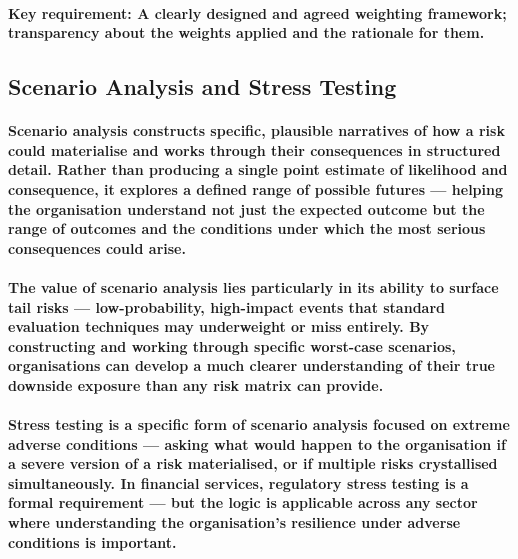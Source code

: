 \paragraph{\textbf{Key requirement}: A clearly designed and agreed weighting framework; transparency about the weights applied and the rationale for them.}

\subsection{Scenario Analysis and Stress Testing}
\paragraph{\textbf{Scenario analysis} constructs specific, plausible narratives of how a risk could materialise and works through their consequences in structured detail. Rather than producing a single point estimate of likelihood and consequence, it explores a defined range of possible futures — helping the organisation understand not just the expected outcome but the range of outcomes and the conditions under which the most serious consequences could arise.}
\paragraph{The value of scenario analysis lies particularly in its ability to surface \textbf{tail risks} — low-probability, high-impact events that standard evaluation techniques may underweight or miss entirely. By constructing and working through specific worst-case scenarios, organisations can develop a much clearer understanding of their true downside exposure than any risk matrix can provide.}
\paragraph{\textbf{Stress testing} is a specific form of scenario analysis focused on extreme adverse conditions — asking what would happen to the organisation if a severe version of a risk materialised, or if multiple risks crystallised simultaneously. In financial services, regulatory stress testing is a formal requirement — but the logic is applicable across any sector where understanding the organisation's resilience under adverse conditions is important.}
